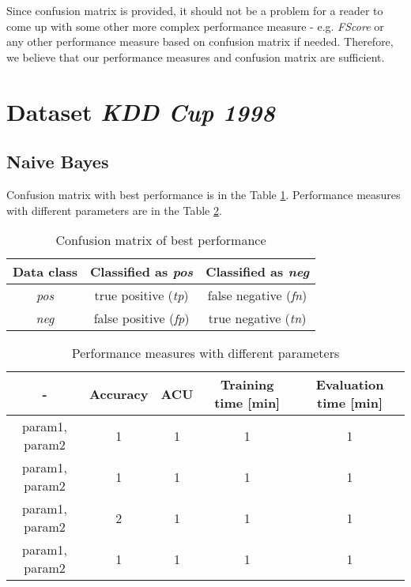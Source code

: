 \documentclass[11pt,a4paper,titlepage]{article}
\begin{document}
Since confusion matrix is provided, it should not be a problem for a reader to come up with some other more complex performance measure - e.g. \textit{FScore} or any other performance measure based on confusion matrix if needed. Therefore, we believe that our performance measures and confusion matrix are sufficient.

\section{Dataset \textit{KDD Cup 1998}}

\subsection{Naive Bayes}
Confusion matrix with best performance is in the Table \ref{table:confusionMatrixBayesKDD}. Performance measures with different parameters are in the Table \ref{table:BayesKDD}.
\begin{table}
  \centering
  \begin{tabular}{| c | c | c |}
    \hline
    Data class & Classified as \textit{pos} & Classified as \textit{neg} \\ \hline
    \textit{pos} & true positive (\textit{tp}) & false negative (\textit{fn}) \\ \hline
    \textit{neg} & false positive (\textit{fp}) & true negative (\textit{tn}) \\
    \hline
  \end{tabular}
  \caption{Confusion matrix of best performance}
  \label{table:confusionMatrixBayesKDD}
  \end{table}
  
  \begin{table}
  \centering
  \begin{tabular}{| c | c | c | c | c |}
    \hline
     		-	   & Accuracy & 	ACU 	& Training time [min] & Evaluation time [min] \\ \hline
    param1, param2 &  1 	  &     1		& 		1			  & 		1 		\\ \hline
    param1, param2 & 	1	  & 	1 		& 		1			  &			1 		\\ \hline
    param1, param2 & 	2	  & 	1		& 		1			  &			1		\\ \hline
    param1, param2 &  1       & 	1		& 		1			  &			1			\\
    \hline
  \end{tabular}
  \caption{Performance measures with different parameters}
  \label{table:BayesKDD}
  \end{table}
  
\end{document}
